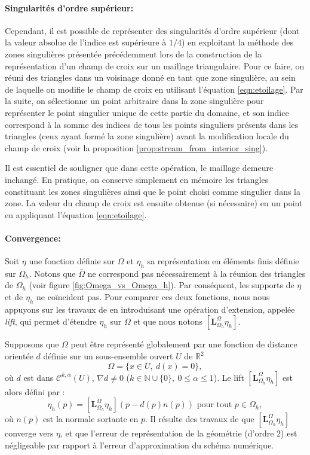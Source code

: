 \paragraph{Singularités d'ordre supérieur:} Cependant, il est possible de représenter des singularités d'ordre supérieur (dont la valeur absolue de l'indice est supérieure à $1/4$) en exploitant la méthode des zones singulières présentée précédemment lors de la construction de la représentation d'un champ de croix sur un maillage triangulaire. Pour ce faire, on réuni des triangles dans un voisinage donné en tant que zone singulière, au sein de laquelle on modifie le champ de croix en utilisant l'équation \eqref{eqn:etoilage}. Par la suite, on sélectionne un point arbitraire dans la zone singulière pour représenter le point singulier unique de cette partie du domaine, et son indice correspond à la somme des indices de tous les points singuliers présents dans les triangles (ceux ayant formé la zone singulière) avant la modification locale du champ de croix (voir la proposition \ref{prop:stream_from_interior_sing}).

Il est essentiel de souligner que dans cette opération, le maillage demeure inchangé. En pratique, on conserve simplement en mémoire les triangles constituant les zones singulières ainsi que le point choisi comme singulier dans la zone. La valeur du champ de croix est ensuite obtenue (si nécessaire) en un point en appliquant l'équation \eqref{eqn:etoilage}.

\paragraph{Convergence:}
Soit $\eta$ une fonction définie sur $\Omega$ et $\eta_h$ sa représentation en éléments finis définie sur $\Omega_h$. Notons que $\bar{\Omega}$ ne correspond pas nécessairement à la réunion des triangles de $\Omega_h$ (voir figure \ref{fig:Omega_vs_Omega_h}). Par conséquent, les supports de $\eta$ et de $\eta_h$ ne coïncident pas. Pour comparer ces deux fonctions, nous nous appuyons sur les travaux de \cite{dziuk1988finite} en introduisant une opération d'extension, appelée \emph{lift}, qui permet d'étendre $\eta_h$ sur $\Omega$ et que nous notons $[\mathbf{L}_{\Omega_h}^{\Omega}\eta_h]$.

Supposons que $\Omega$ peut être représenté globalement par une fonction de distance orientée $d$ définie sur un sous-ensemble ouvert $U$ de $\mathbb{R}^2$
\[
\Omega=\{x\in U,~d(x)=0\},
\]
où $d$ est dans $\mathcal{C}^{k,\alpha}(U)$, $\nabla d\neq 0$ ($k\in\mathbb{N}\cup\{0\},~0\leq\alpha\leq 1$). Le lift $[\mathbf{L}_{\Omega_h}^{\Omega}\eta_h]$ est alors défini par :
\begin{equation}
\eta_h(p)=[\mathbf{L}_{\Omega_h}^{\Omega}\eta_h](p-d(p)n(p))\mbox{ pour tout }p\in\Omega_h,
\end{equation}
où $n(p)$ est la normale sortante en $p$. Il résulte des travaux de \cite{dziuk1988finite} que $[\mathbf{L}_{\Omega_h}^{\Omega}\eta_h]$ converge vers $\eta$, et que l'erreur de représentation de la géométrie (d'ordre 2) est négligeable par rapport à l'erreur d'approximation du schéma numérique.


